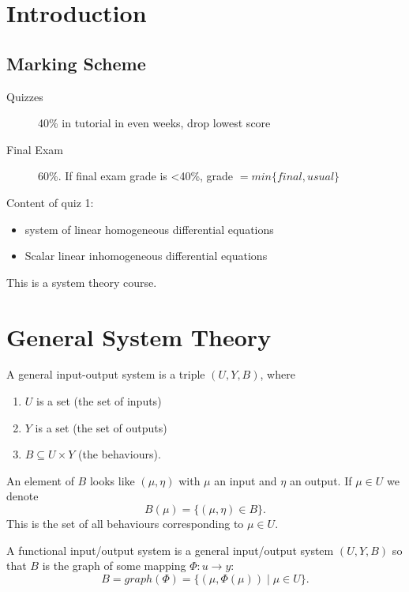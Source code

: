 	
	\section{Introduction}
	\subsection{Marking Scheme}
	\begin{description}
		\item[Quizzes] 40\% in tutorial in even weeks, drop lowest score
		\item[Final Exam] 60\%. If final exam grade is <40\%, grade $=min\{final, usual\}$
	\end{description}
	
	Content of quiz 1:

	\begin{itemize}
		\item system of linear homogeneous differential equations 
		\item Scalar linear inhomogeneous differential equations 
	\end{itemize}
	
	This is a system theory course. 

	\section{General System Theory}
	
	\begin{definition}
		A general input-output system is a triple $(U, Y, B)$, where

	\begin{enumerate}
		\item $U$ is a set (the set of inputs)
		\item $Y$ is a set (the set of outputs)
		\item $B \subseteq U \times  Y$ (the behaviours).
	\end{enumerate}
	\end{definition} 
	An element of $B$ looks like $(\mu , \eta)$ with $\mu$ an input and $\eta$ an output. If $\mu \in U$ we denote 
	\[
		B(\mu) = \{(\mu, \eta) \in B\}
	.\]
	This is the set of all behaviours corresponding to $\mu \in U$. 

	\begin{definition}
		A functional input/output system is a general input/output system $(U, Y, B)$ so that $B$ is the graph of some mapping $ \Phi : u \to y $:
	\[
		B = graph(\Phi) = \{(\mu, \Phi (\mu))  \mid \mu \in  U\}
	.\] 
	\end{definition}

